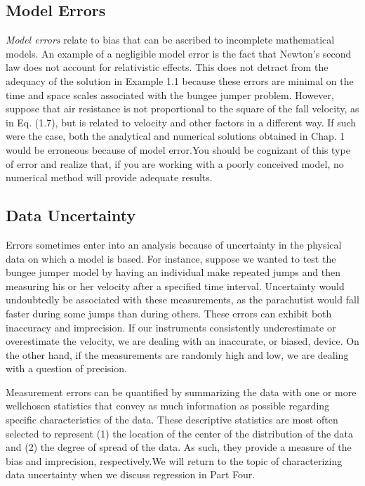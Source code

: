 \documentclass[../main.tex]{subfiles}
\begin{document}
\subsection{Model Errors}
\noindent
\emph{Model errors} relate to bias that can be ascribed to incomplete mathematical models. An example
of a negligible model error is the fact that Newton's second law does not account for
relativistic effects. This does not detract from the adequacy of the solution in Example 1.1
because these errors are minimal on the time and space scales associated with the bungee
jumper problem.
However, suppose that air resistance is not proportional to the square of the fall velocity,
as in Eq. (1.7), but is related to velocity and other factors in a different way. If such were the
case, both the analytical and numerical solutions obtained in Chap. 1 would be erroneous because
of model error.You should be cognizant of this type of error and realize that, if you are
working with a poorly conceived model, no numerical method will provide adequate results.\\

\subsection{Data Uncertainty}
\noindent
Errors sometimes enter into an analysis because of uncertainty in the physical data on which
a model is based. For instance, suppose we wanted to test the bungee jumper model by having
an individual make repeated jumps and then measuring his or her velocity after a specified
time interval. Uncertainty would undoubtedly be associated with these measurements, as
the parachutist would fall faster during some jumps than during others. These errors can exhibit
both inaccuracy and imprecision. If our instruments consistently underestimate or overestimate
the velocity, we are dealing with an inaccurate, or biased, device. On the other hand,
if the measurements are randomly high and low, we are dealing with a question of precision.

Measurement errors can be quantified by summarizing the data with one or more wellchosen
statistics that convey as much information as possible regarding specific characteristics
of the data. These descriptive statistics are most often selected to represent (1) the
location of the center of the distribution of the data and (2) the degree of spread of the data.
As such, they provide a measure of the bias and imprecision, respectively.We will return to
the topic of characterizing data uncertainty when we discuss regression in Part Four.
\end{document}
